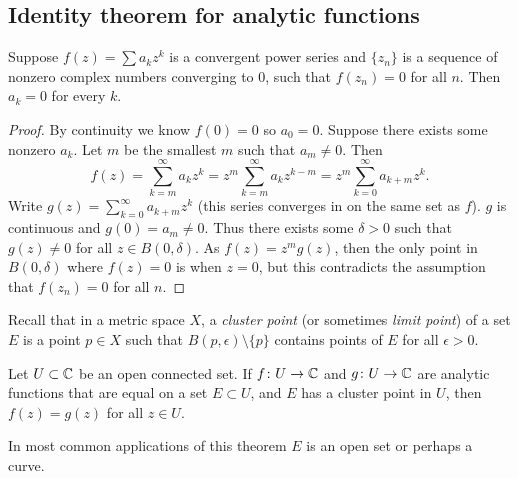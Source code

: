 \subsection{Identity theorem for analytic functions}

\begin{lemma}
Suppose $f(z) = \sum a_k z^k$ is a convergent power series and
$\{ z_n \}$ is a sequence of nonzero complex numbers converging to 0,
such that $f(z_n) = 0$ for all $n$.  Then $a_k = 0$ for every $k$.
\end{lemma}

\begin{proof}
By continuity we know $f(0) = 0$ so $a_0 = 0$.
Suppose there exists some nonzero $a_k$.
Let $m$ be the smallest $m$ such that $a_m \not= 0$.  Then
\begin{equation*}
f(z) = \sum_{k=m}^\infty a_k z^k = 
z^m \sum_{k=m}^\infty a_k z^{k-m} =
z^m \sum_{k=0}^\infty a_{k+m} z^{k} .
\end{equation*}
Write $g(z) = \sum_{k=0}^\infty a_{k+m} z^{k}$ (this series converges in
on the same set as $f$).  $g$ is continuous and $g(0) = a_m \not= 0$.  Thus
there exists some $\delta > 0$ such that $g(z) \not= 0$ for all $z \in
B(0,\delta)$.  As $f(z) = z^m g(z)$, then the only point in $B(0,\delta)$ where
$f(z) = 0$ is when $z=0$, but this contradicts the assumption
that $f(z_n) = 0$ for all $n$.
\end{proof}

Recall that in a metric space $X$, a \emph{cluster point}
(or sometimes \emph{limit point}) of a set
$E$ is a point $p \in X$ such that
$B(p,\epsilon) \setminus \{ p \}$ contains points of $E$
for all $\epsilon > 0$.

\begin{thm} \label{thm:identityanalytic}
Let $U \subset {\mathbb{C}}$ be an open connected set.  If $f \colon U \to {\mathbb{C}}$
and $g \colon U \to {\mathbb{C}}$ are analytic functions that are
equal on a set $E \subset U$, and $E$ has a cluster point
in $U$, then $f(z) = g(z)$ for all $z \in U$.
\end{thm}

In most common applications of this theorem $E$ is an open set or perhaps a curve.

